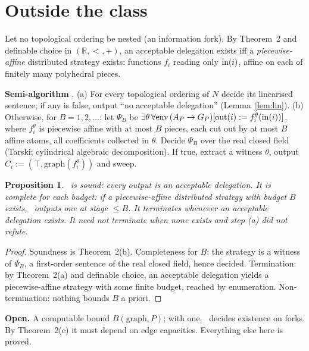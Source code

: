 \documentclass[10pt]{article}
\theoremstyle{plain}\newtheorem{theorem}{Theorem}\newtheorem{lemma}{Lemma}\newtheorem{proposition}{Proposition}
\theoremstyle{definition}\newtheorem{definition}{Definition}\newtheorem{remark}{Remark}
\begin{document}
\section{Outside the class}
Let no topological ordering be nested (an information fork). By Theorem~2 and definable choice in $(\mathbb R,<,+)$, an acceptable delegation exists iff a \emph{piecewise-affine} distributed strategy exists: functions $f_i$ reading only $\mathrm{in}(i)$, affine on each of finitely many polyhedral pieces.

\textbf{Semi-algorithm} \Fk. (a) For every topological ordering of $N$ decide its linearised sentence; if any is false, output ``no acceptable delegation'' (Lemma~\ref{lem:lin}). (b) Otherwise, for $B=1,2,\dots$: let $\Psi_B$ be $\exists\theta\,\forall\text{env}\,(A_P\to G_P)[\mathrm{out}(i):=f_i^\theta(\mathrm{in}(i))]$, where $f_i^\theta$ is piecewise affine with at most $B$ pieces, each cut out by at most $B$ affine atoms, all coefficients collected in $\theta$. Decide $\Psi_B$ over the real closed field (Tarski; cylindrical algebraic decomposition). If true, extract a witness $\theta$, output $C_i:=(\top,\mathrm{graph}(f_i^\theta))$ and sweep.

\begin{proposition}
\Fk\ is sound: every output is an acceptable delegation. It is complete for each budget: if a piecewise-affine distributed strategy with budget $B$ exists, \Fk\ outputs one at stage $\le B$. It terminates whenever an acceptable delegation exists. It need not terminate when none exists and step (a) did not refute.
\end{proposition}
\begin{proof}
Soundness is Theorem~2(b). Completeness for $B$: the strategy is a witness of $\Psi_B$, a first-order sentence of the real closed field, hence decided. Termination: by Theorem~2(a) and definable choice, an acceptable delegation yields a piecewise-affine strategy with some finite budget, reached by enumeration. Non-termination: nothing bounds $B$ a priori.
\end{proof}
\textbf{Open.} A computable bound $B(\text{graph},P)$; with one, \Fk\ decides existence on forks. By Theorem~2(c) it must depend on edge capacities. Everything else here is proved.
\end{document}
